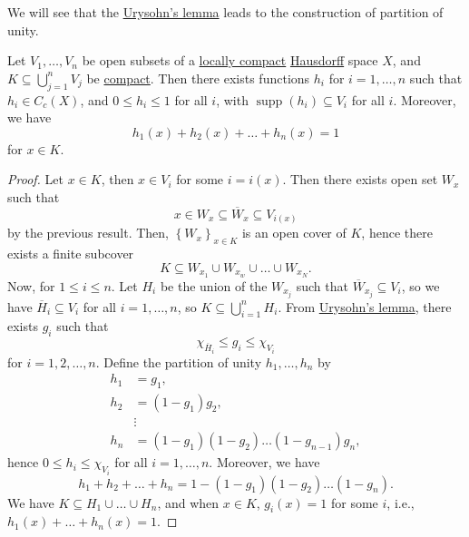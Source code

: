 We will see that the \hyperref[thm:Urysohn-lemma]{Urysohn's lemma} leads to the construction of partition of unity.

\begin{theorem}
	Let \(V_1, \dots , V_n\) be open subsets of a \hyperref[def:locally-compact]{locally compact} \hyperref[def:Hausdorff]{Hausdorff} space \(X\), and \(K \subseteq \bigcup_{j=1}^{n} V_j\) be \hyperref[def:compact]{compact}. Then there exists functions \(h_i\) for \(i = 1, \dots  , n\) such that \(h_i \in C_c(X)\), and \(0 \leq h_i \leq 1\) for all \(i\), with \(\mathop{\mathrm{supp}}(h_i) \subseteq V_i\) for all \(i\). Moreover, we have
	\[
		h_1 (x) + h_2(x) + \dots  + h_n(x) = 1
	\]
	for \(x\in K\).
\end{theorem}
\begin{proof}
	Let \(x\in K\), then \(x\in V_i\) for some \(i = i(x)\). Then there exists open set \(W_x\) such that
	\[
		x\in W_x \subseteq \overline{W} _x \subseteq V_{i(x)}
	\]
	by the previous result. Then, \(\left\{ W_x \right\} _{x\in K}\) is an open cover of \(K\), hence there exists a finite subcover
	\[
		K \subseteq W_{x_1} \cup W_{x_w} \cup \dots \cup W_{x_N}.
	\]
	Now, for \(1 \leq i \leq n\). Let \(H_i\) be the union of the \(W_{x_j}\) such that \(\overline{W} _{x_j} \subseteq V_i\), so we have \(\overline{H} _i \subseteq V_i\) for all \(i = 1, \dots  , n\), so \(K \subseteq \bigcup_{i=1}^{n} H_i\). From \hyperref[thm:Urysohn-lemma]{Urysohn's lemma}, there exists \(g_i\) such that
	\[
		\chi _{\overline{H} _i} \leq g_i \leq \chi _{V_i}
	\]
	for \(i = 1, 2, \dots  , n\). Define the partition of unity \(h_1, \dots, h_n\) by
	\[
		\begin{split}
			h_1 &= g_1, \\
			h_2 &= (1-g_1)g_2, \\
			&\vdots \\
			h_n &= (1-g_1)(1-g_2) \dots  (1-g_{n-1}) g_n,
		\end{split}
	\]
	hence \(0 \leq h_i \leq \chi _{V_i}\) for all \(i = 1, \dots  , n\). Moreover, we have
	\[
		h_1 + h_2 + \dots  + h_n = 1 - (1-g_1)(1-g_2)\dots  (1-g_n).
	\]
	We have \(K \subseteq H_1 \cup \dots  \cup H_n\), and when \(x\in K\), \(g_i(x) = 1\) for some \(i\), i.e., \(h_1 (x) + \dots  + h_n(x) = 1\).
\end{proof}

